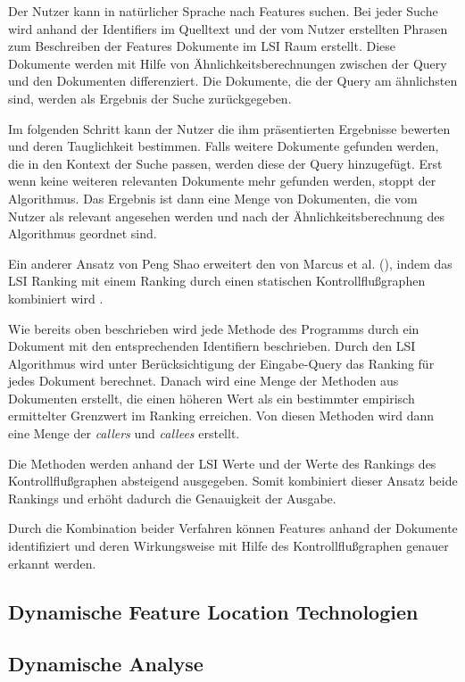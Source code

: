 \documentclass[runningheads,a4paper]{llncs}
\begin{document}
Der Nutzer kann in natürlicher Sprache nach Features suchen. Bei jeder Suche wird anhand der Identifiers im Quelltext und der vom Nutzer erstellten Phrasen zum Beschreiben der Features Dokumente im LSI Raum erstellt. Diese Dokumente werden mit Hilfe von Ähnlichkeitsberechnungen zwischen der Query und den Dokumenten differenziert. Die Dokumente, die der Query am ähnlichsten sind, werden als Ergebnis der Suche zurückgegeben.

Im folgenden Schritt kann der Nutzer die ihm präsentierten Ergebnisse bewerten und deren Tauglichkeit bestimmen. Falls weitere Dokumente gefunden werden, die in den Kontext der Suche passen, werden diese der Query hinzugefügt. Erst wenn keine weiteren relevanten Dokumente mehr gefunden werden, stoppt der Algorithmus. Das Ergebnis ist dann eine Menge von Dokumenten, die vom Nutzer als relevant angesehen werden und nach der Ähnlichkeitsberechnung des Algorithmus geordnet sind.

Ein anderer Ansatz von Peng Shao erweitert den von Marcus et al. (\cite{marcus1}\cite{marcus2}), indem das LSI Ranking mit einem Ranking durch einen statischen Kontrollflußgraphen kombiniert wird \cite{shao}.

Wie bereits oben beschrieben wird jede Methode des Programms durch ein Dokument mit den entsprechenden Identifiern beschrieben. Durch den LSI Algorithmus wird unter Berücksichtigung der Eingabe-Query das Ranking für jedes Dokument berechnet. Danach wird eine Menge der Methoden aus Dokumenten erstellt, die einen höheren Wert als ein bestimmter empirisch ermittelter Grenzwert im Ranking erreichen. Von diesen Methoden wird dann eine Menge der \textit{callers} und \textit{callees} erstellt.

Die Methoden werden anhand der LSI Werte und der Werte des Rankings des Kontrollflußgraphen absteigend ausgegeben. Somit kombiniert dieser Ansatz beide Rankings und erhöht dadurch die Genauigkeit der Ausgabe.

Durch die Kombination beider Verfahren können Features anhand der Dokumente identifiziert und deren Wirkungsweise mit Hilfe des Kontrollflußgraphen genauer erkannt werden.

\subsection{Dynamische Feature Location Technologien}

\subsection*{Dynamische Analyse}
\end{document}
